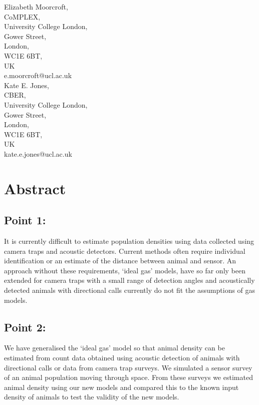\documentclass[a4paper,10pt,reqno,oneside]{amsart}
\begin{document}
Elizabeth Moorcroft,\\
CoMPLEX,\\
University College London,\\
Gower Street,\\
London,\\
WC1E 6BT, \\
UK\\
e.moorcroft@ucl.ac.uk\\

Kate E. Jones,\\
CBER,\\
University College London,\\
Gower Street,\\
London,\\
WC1E 6BT, \\
UK\\
kate.e.jones@ucl.ac.uk\\

\clearpage



\section{Abstract}
\subsection*{Point 1:}   It is currently difficult to estimate population densities using data collected using camera traps and acoustic detectors. Current methods often require individual identification or an estimate of the distance between animal and sensor. An approach without these requirements, `ideal gas' models, have so far only been extended for camera traps with a small range of detection angles and acoustically detected animals with directional calls currently do not fit the assumptions of gas models.

\subsection*{Point 2:} We have generalised the `ideal gas' model so that animal density can be estimated from count data obtained using acoustic detection of animals with directional calls or data from camera trap surveys. We simulated a sensor survey of an animal population moving through space. From these surveys we estimated animal density using our new models and compared this to the known input density of animals to test the validity of the new models.
\end{document}
